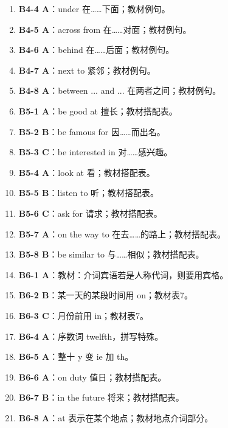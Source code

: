 \documentclass[11pt,a4paper]{ctexart}
\begin{document}
\begin{enumerate}[leftmargin=1.6em,itemsep=2pt]
\item \textbf{B4-4 A}：under 在……下面；教材例句。
\item \textbf{B4-5 A}：across from 在……对面；教材例句。
\item \textbf{B4-6 A}：behind 在……后面；教材例句。
\item \textbf{B4-7 A}：next to 紧邻；教材例句。
\item \textbf{B4-8 A}：between ... and ... 在两者之间；教材例句。
\item \textbf{B5-1 A}：be good at 擅长；教材搭配表。
\item \textbf{B5-2 B}：be famous for 因……而出名。
\item \textbf{B5-3 C}：be interested in 对……感兴趣。
\item \textbf{B5-4 A}：look at 看；教材搭配表。
\item \textbf{B5-5 B}：listen to 听；教材搭配表。
\item \textbf{B5-6 C}：ask for 请求；教材搭配表。
\item \textbf{B5-7 A}：on the way to 在去……的路上；教材搭配表。
\item \textbf{B5-8 B}：be similar to 与……相似；教材搭配表。
\item \textbf{B6-1 A}：教材：介词宾语若是人称代词，则要用宾格。
\item \textbf{B6-2 B}：某一天的某段时间用 on；教材表7。
\item \textbf{B6-3 C}：月份前用 in；教材表7。
\item \textbf{B6-4 A}：序数词 twelfth，拼写特殊。
\item \textbf{B6-5 A}：整十 y 变 ie 加 th。
\item \textbf{B6-6 A}：on duty 值日；教材搭配表。
\item \textbf{B6-7 B}：in the future 将来；教材搭配表。
\item \textbf{B6-8 A}：at 表示在某个地点；教材地点介词部分。
\end{enumerate}
\end{document}
